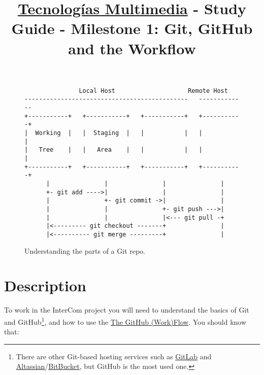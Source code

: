 \title{\href{https://www.ual.es/estudios/grados/presentacion/plandeestudios/asignatura/4015/40154321?idioma=zh_CN}{Tecnologías Multimedia} - Study Guide - Milestone 1: Git, GitHub and the Workflow}

\maketitle

\begin{figure}
\begin{verbatim}
               Local Host                    Remote Host
---------------------------------------------   -------------
+-----------+   +-----------+   +-----------+   +-----------+
|  Working  |   |  Staging  |   |           |   |           |
|   Tree    |   |   Area    |   |           |   |           |
+-----------+   +-----------+   +-----------+   +-----------+
      |               |               |               |
      +- git add ---->|               |               |
      |               +- git commit ->|               |
      |               |               +- git push --->|
      |               |               |<--- git pull -+
      |<--------- git checkout -------+               |
      |<---------- git merge ---------+               |
\end{verbatim}
\caption{Understanding the parts of a Git repo.}
\label{fig:local_repo_structure_and_actions}
\end{figure}

\section{Description}

To work in the InterCom project \cite{intercom} you will need to
understand the basics of Git and GitHub\footnote{There are other
Git-based hosting services such as
\href{https://about.gitlab.com/}{GitLab} and
\href{https://www.atlassian.com/git}{Altassian}/\href{https://bitbucket.org/product}{BitBucket},
but GitHub is the most used one.}, and how to use the
\href{https://guides.github.com/introduction/flow/index.html}{The
  GitHub (Work)Flow}. You should know that:

